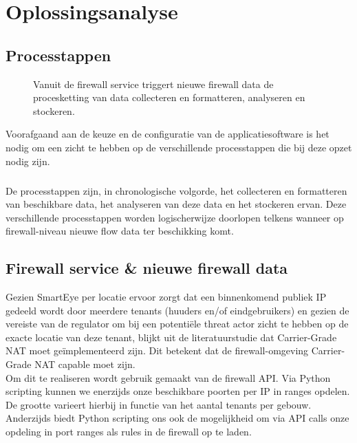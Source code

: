 \chapter{Oplossingsanalyse}
\section{Processtappen}

\begin{figure}[H]
    
    \caption[short description]{Vanuit de firewall service triggert nieuwe firewall data de procesketting van data collecteren en formatteren, analyseren en stockeren.}
    \label{fig:Oplossingsvoorstel}
\end{figure}

Voorafgaand aan de keuze en de configuratie van de applicatiesoftware is het nodig om een zicht te hebben op de verschillende processtappen die bij deze opzet nodig zijn.

\paragraph{}
De processtappen zijn, in chronologische volgorde, het collecteren en formatteren van beschikbare data, het analyseren van deze data en het stockeren ervan. Deze verschillende processtappen worden logischerwijze doorlopen telkens wanneer op firewall-niveau nieuwe flow data ter beschikking komt.

\section{Firewall service \& nieuwe firewall data}
Gezien SmartEye per locatie ervoor zorgt dat een binnenkomend publiek IP gedeeld wordt door meerdere tenants (huuders en/of eindgebruikers) en gezien de vereiste van de regulator om bij een potentiële threat actor zicht te hebben op de exacte locatie van deze tenant, blijkt uit de literatuurstudie dat Carrier-Grade NAT moet geïmplementeerd zijn. Dit betekent dat de firewall-omgeving Carrier-Grade NAT capable moet zijn.\\ Om dit te realiseren wordt gebruik gemaakt van de firewall API. Via Python scripting kunnen we enerzijds onze beschikbare poorten per IP in ranges opdelen. De grootte varieert hierbij in functie van het aantal tenants per gebouw. Anderzijds biedt Python scripting ons ook de mogelijkheid om via API calls onze opdeling in port ranges als rules in de firewall op te laden.

